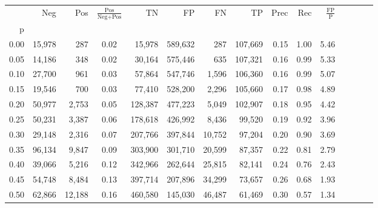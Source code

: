 \begin{tabular}{rrrcrrrrrrrrrrr}
\toprule
{} &     Neg &     Pos & $\frac{\text{Pos}}{\text{Neg}+\text{Pos}}$ &       TN &       FP &       FN &       TP &  Prec &   Rec & $\frac{\text{FP}}{\text{P}}$ \\
p    &         &         &                                            &          &          &          &          &       &       &                              \\
\midrule
0.00 &  15,978 &     287 &                                       0.02 &   15,978 &  589,632 &      287 &  107,669 &  0.15 &  1.00 &                         5.46 \\
0.05 &  14,186 &     348 &                                       0.02 &   30,164 &  575,446 &      635 &  107,321 &  0.16 &  0.99 &                         5.33 \\
0.10 &  27,700 &     961 &                                       0.03 &   57,864 &  547,746 &    1,596 &  106,360 &  0.16 &  0.99 &                         5.07 \\
0.15 &  19,546 &     700 &                                       0.03 &   77,410 &  528,200 &    2,296 &  105,660 &  0.17 &  0.98 &                         4.89 \\
0.20 &  50,977 &   2,753 &                                       0.05 &  128,387 &  477,223 &    5,049 &  102,907 &  0.18 &  0.95 &                         4.42 \\
0.25 &  50,231 &   3,387 &                                       0.06 &  178,618 &  426,992 &    8,436 &   99,520 &  0.19 &  0.92 &                         3.96 \\
0.30 &  29,148 &   2,316 &                                       0.07 &  207,766 &  397,844 &   10,752 &   97,204 &  0.20 &  0.90 &                         3.69 \\
0.35 &  96,134 &   9,847 &                                       0.09 &  303,900 &  301,710 &   20,599 &   87,357 &  0.22 &  0.81 &                         2.79 \\
0.40 &  39,066 &   5,216 &                                       0.12 &  342,966 &  262,644 &   25,815 &   82,141 &  0.24 &  0.76 &                         2.43 \\
0.45 &  54,748 &   8,484 &                                       0.13 &  397,714 &  207,896 &   34,299 &   73,657 &  0.26 &  0.68 &                         1.93 \\
0.50 &  62,866 &  12,188 &                                       0.16 &  460,580 &  145,030 &   46,487 &   61,469 &  0.30 &  0.57 &                         1.34 \\

\end{tabular}
